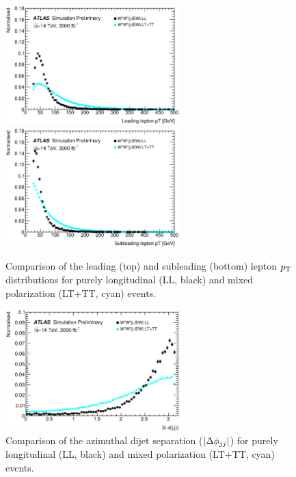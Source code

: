 \begin{figure}[htp]
  \centering
  \includegraphics[width=0.6\textwidth]{figs/ssww_upgrade/polarization/lepton0_pt_pass9}\\
  \includegraphics[width=0.6\textwidth]{figs/ssww_upgrade/polarization/lepton1_pt_pass9}
  \caption{Comparison of the leading (top) and subleading (bottom) lepton $p_{\mathrm{T}}$ distributions for purely longitudinal (LL, black) and mixed polarization (LT+TT, cyan) \ssww events.}
  \label{fig:polarization_leppt}
\end{figure}

\begin{figure}[htp]
  \centering
  \includegraphics[width=0.6\textwidth]{figs/ssww_upgrade/polarization/dijet_absdphijj_pass9}
  \caption{Comparison of the azimuthal dijet separation ($|\Delta\phi_{jj}|$) for purely longitudinal (LL, black) and mixed polarization (LT+TT, cyan) \ssww events.}
  \label{fig:polarization_dphijj}
\end{figure}
